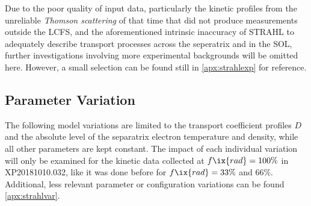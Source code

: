 %
            \newline%
            Due to the poor quality of input data, particularly the kinetic profiles from the unreliable \textit{Thomson scattering} of that time that did not produce measurements outside the LCFS, and the aforementioned intrinsic inaccuracy of STRAHL to adequately describe transport processes across the seperatrix and in the SOL, further investigations involving more experimental backgrounds will be omitted here. However, a small selection can be found still in \cref{apx:strahlexp} for reference.%
%
        \subsection{Parameter Variation}\label{subsec:parametervar}%
%
            The following model variations are limited to the transport coefficient profiles $D$ and the absolute level of the separatrix electron temperature and density, while all other parameters are kept constant. The impact of each individual variation will only be examined for the kinetic data collected at $f\ix{rad}=100\%$ in XP20181010.032, like it was done before for $f\ix{rad}=33\%$ and 66\%. Additional, less relevant parameter or configuration variations can be found \cref{apx:strahlvar}.%
%
